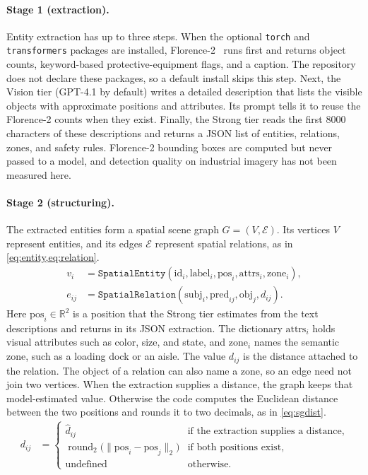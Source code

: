 \documentclass{article}
\begin{document}
\paragraph{Stage 1 (extraction).}
Entity extraction has up to three steps. When the optional \texttt{torch} and \texttt{transformers} packages are installed, Florence-2~\citep{xiao2024florence2} runs first and returns object counts, keyword-based protective-equipment flags, and a caption. The repository does not declare these packages, so a default install skips this step. Next, the Vision tier (GPT-4.1 by default) writes a detailed description that lists the visible objects with approximate positions and attributes. Its prompt tells it to reuse the Florence-2 counts when they exist. Finally, the Strong tier reads the first \num{8000} characters of these descriptions and returns a JSON list of entities, relations, zones, and safety rules. Florence-2 bounding boxes are computed but never passed to a model, and detection quality on industrial imagery has not been measured here.

\paragraph{Stage 2 (structuring).}
The extracted entities form a spatial scene graph $G = (V, \mathcal{E})$. Its vertices $V$ represent entities, and its edges $\mathcal{E}$ represent spatial relations, as in \cref{eq:entity,eq:relation}.
\begin{align}
  v_i &= \texttt{SpatialEntity}(\text{id}_i, \text{label}_i, \text{pos}_i, \text{attrs}_i, \text{zone}_i), \label{eq:entity} \\
  e_{ij} &= \texttt{SpatialRelation}(\text{subj}_i, \text{pred}_{ij}, \text{obj}_j, d_{ij}). \label{eq:relation}
\end{align}
Here $\text{pos}_i \in \mathbb{R}^2$ is a position that the Strong tier estimates from the text descriptions and returns in its JSON extraction. The dictionary $\text{attrs}_i$ holds visual attributes such as color, size, and state, and $\text{zone}_i$ names the semantic zone, such as a loading dock or an aisle. The value $d_{ij}$ is the distance attached to the relation. The object of a relation can also name a zone, so an edge need not join two vertices. When the extraction supplies a distance, the graph keeps that model-estimated value. Otherwise the code computes the Euclidean distance between the two positions and rounds it to two decimals, as in \cref{eq:sgdist}.
\begin{align}
  d_{ij} &=
  \begin{cases}
    \hat{d}_{ij} & \text{if the extraction supplies a distance},\\
    \operatorname{round}_2\bigl(\lVert \text{pos}_i - \text{pos}_j \rVert_2\bigr) & \text{if both positions exist},\\
    \text{undefined} & \text{otherwise.}
  \end{cases} \label{eq:sgdist}
\end{align}
\end{document}
